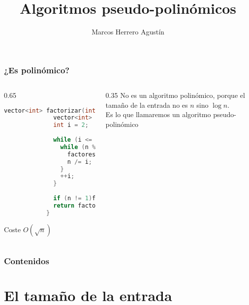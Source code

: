 \documentclass{beamer}
\title[Algoritmos pseudo-polinómicos] %
{Algoritmos pseudo-polinómicos}
\author[Marcos Herrero] %
{Marcos Herrero Agustín}
\date[] %
{}
\begin{document}
\frame{\titlepage}


\begin{frame}[fragile]
	\frametitle{¿Es polinómico?}
	\begin{columns}
		\begin{column}{0.65\textwidth}
		  \begin{lstlisting}[language = C++, basicstyle=\ttfamily\scriptsize]
			vector<int> factorizar(int n) {
			  vector<int> factores;
			  int i = 2;
			
			  while (i <= sqrt(n)) {
			    while (n % i == 0) {
			      factores.push_back(i);
			      n /= i;
			    }
			    ++i;
			  }
			
			  if (n != 1)factores.push_back(n);
			  return factores;
			}
			\end{lstlisting}
			
			Coste $O(\sqrt{n})$
		\end{column}
	    \begin{column}{0.35\textwidth}
	    	No es un algoritmo polinómico, porque el tamaño de la entrada no es $n$ sino $\log n$.\\ Es lo que llamaremos un algoritmo pseudo-polinómico
	    \end{column}
	\end{columns}

\end{frame}

\begin{frame}
	\frametitle{Contenidos}
	\tableofcontents
\end{frame}
\section{El tamaño de la entrada}
\end{document}
